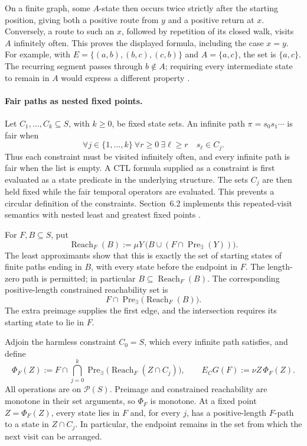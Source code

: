 On a finite graph, some \(A\)-state then occurs twice
strictly after the starting position, giving both a
positive route from \(y\) and a positive return at \(x\).
Conversely, a route to such an \(x\), followed by
repetition of its closed walk, visits \(A\) infinitely
often. This proves the displayed formula, including
the case \(x=y\).
For example, with
\(E=\{(a,b),(b,c),(c,b)\}\) and \(A=\{a,c\}\),
the set is \(\{a,c\}\). The recurring segment passes
through \(b\notin A\); requiring every intermediate
state to remain in \(A\) would express a different
property \cite[\S5.2]{BurchEtAl1992}.

\paragraph{Fair paths as nested fixed points.}
Let \(C_1,\ldots,C_k\subseteq S\), with \(k\geq0\), be fixed state
sets. An infinite path \(\pi=s_0s_1\cdots\) is fair when
\[
 \forall j\in\{1,\ldots,k\}\ \forall r\geq0\
       \exists \ell\geq r\quad s_\ell\in C_j.
\]
Thus each constraint must be visited infinitely often, and every infinite
path is fair when the list is empty. A CTL formula supplied as a constraint
is first evaluated as a state predicate in the underlying structure.
The sets \(C_j\) are then held fixed while the fair temporal operators are
evaluated. This prevents a circular definition of the constraints.
Section~6.2 implements this repeated-visit semantics with nested least and
greatest fixed points \cite[\S6.2]{BurchEtAl1992}.

For \(F,B\subseteq S\), put
\[
 \operatorname{Reach}_F(B)
   :=\mu Y\,\bigl(B\cup(F\cap\operatorname{Pre}_{\exists}(Y))\bigr).
\]
The least approximants show that this is exactly the set of starting
states of finite paths ending in \(B\), with every state before the
endpoint in \(F\). The length-zero path is permitted; in particular
\(B\subseteq\operatorname{Reach}_F(B)\). The corresponding
positive-length constrained reachability set is
\[
 F\cap\operatorname{Pre}_{\exists}
           \bigl(\operatorname{Reach}_F(B)\bigr).
\]
The extra preimage supplies the first edge, and the intersection
requires its starting state to lie in \(F\).

Adjoin the harmless constraint \(C_0=S\), which every infinite path
satisfies, and define
\[
 \Phi_F(Z)
   :=F\cap\bigcap_{j=0}^{k}
       \operatorname{Pre}_{\exists}
          \bigl(\operatorname{Reach}_F(Z\cap C_j)\bigr),
 \qquad
 E_CG(F):=\nu Z\,\Phi_F(Z).
\]
All operations are on \(\mathcal P(S)\). Preimage and constrained
reachability are monotone in their set arguments, so \(\Phi_F\) is
monotone. At a fixed point \(Z=\Phi_F(Z)\), every state lies in \(F\)
and, for every \(j\), has a positive-length \(F\)-path to a state in
\(Z\cap C_j\). In particular, the endpoint remains in the set from
which the next visit can be arranged.

